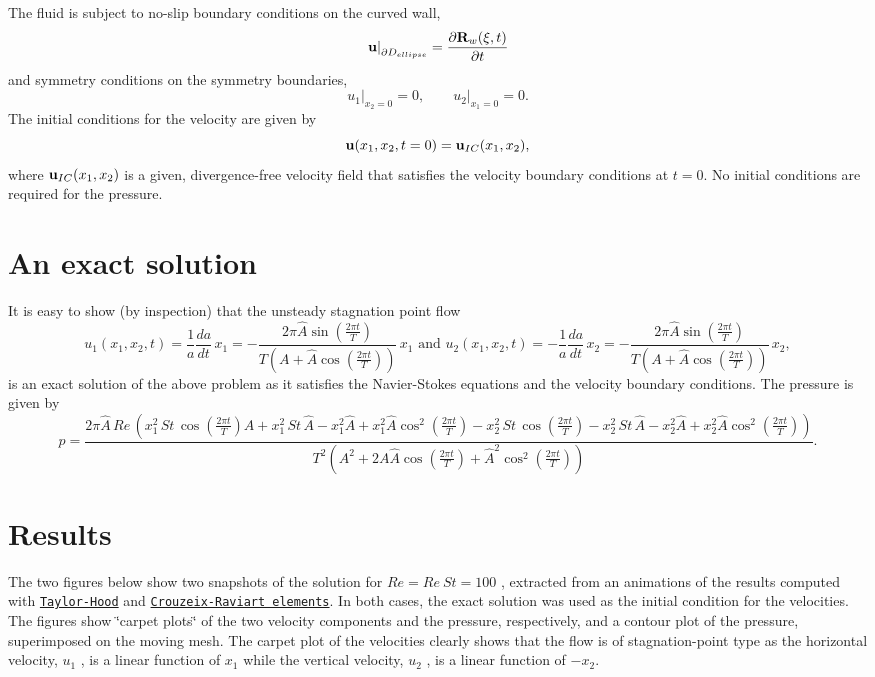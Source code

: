 \begin{center}
\begin{longtabu}
The fluid is subject to no-\/slip boundary conditions on the curved wall, \[ \left. {\bf u} \right|_{\partial D_{ellipse}} = \frac{\partial {\bf R}_w(\xi, t)}{\partial t} \] and symmetry conditions on the symmetry boundaries, \[ \left.u_1\right|_{x_2=0}=0, \qquad \left.u_2\right|_{x_1=0}=0. \] The initial conditions for the velocity are given by \[ {\bf u}(x_1,x_2,t=0) = {\bf u}_{IC}(x_1,x_2), \] where $ {\bf u}_{IC}(x_1,x_2) $ is a given, divergence-\/free velocity field that satisfies the velocity boundary conditions at $ t=0 $. No initial conditions are required for the pressure.   \\
\end{longtabu}
\end{center} 



\hypertarget{index_solution}{}\section{An exact solution}\label{index_solution}
It is easy to show (by inspection) that the unsteady stagnation point flow \[ u_1(x_1,x_2,t) = \frac{1}{a}\frac{da}{dt}\, x_1 = -\frac{2\pi\widehat{A}\sin\left(\frac{2\pi t}{T}\right)} {T\left(A+\widehat{A}\cos\left(\frac{2\pi t}{T}\right)\right)} \, x_1 \mbox{\ \ \ \ and \ \ \ \ \ } u_2(x_1,x_2,t) = -\frac{1}{a}\frac{da}{dt} \, x_2 = -\frac{2\pi\widehat{A}\sin\left(\frac{2\pi t}{T}\right)} {T\left(A+\widehat{A}\cos\left(\frac{2\pi t}{T}\right)\right)} \, x_2, \] is an exact solution of the above problem as it satisfies the Navier-\/\+Stokes equations and the velocity boundary conditions. The pressure is given by \[ p = \frac{2\pi\widehat{A}\, Re\, \left(x_1^2\, St\, \cos\left(\frac{2\pi t}{T}\right)A + x_1^2\, St\, \widehat{A} - x_1^2\widehat{A} + x_1^2\widehat{A}\cos^2\left(\frac{2\pi t}{T}\right) - x_2^2\, St\, \cos\left(\frac{2\pi t}{T}\right) - x_2^2\, St\, \widehat{A} - x_2^2\widehat{A} + x_2^2\widehat{A}\cos^2\left(\frac{2\pi t}{T}\right)\right)} {T^2\left(A^2 + 2A\widehat{A}\cos\left(\frac{2\pi t}{T}\right) + \widehat{A}^2\cos^2\left(\frac{2\pi t}{T}\right)\right)}. \]



\hypertarget{index_results}{}\section{Results}\label{index_results}
The two figures below show two snapshots of the solution for $ Re=Re \ St=100 $ , extracted from an animations of the results computed with \href{../figures/TH.avi}{\tt Taylor-\/\+Hood} and \href{../figures/CR.avi}{\tt Crouzeix-\/\+Raviart elements}. In both cases, the exact solution was used as the initial condition for the velocities. The figures show \char`\"{}carpet plots\char`\"{} of the two velocity components and the pressure, respectively, and a contour plot of the pressure, superimposed on the moving mesh. The carpet plot of the velocities clearly shows that the flow is of stagnation-\/point type as the horizontal velocity, $u_1$ , is a linear function of $x_1$ while the vertical velocity, $u_2$ , is a linear function of $ - x_2$.

